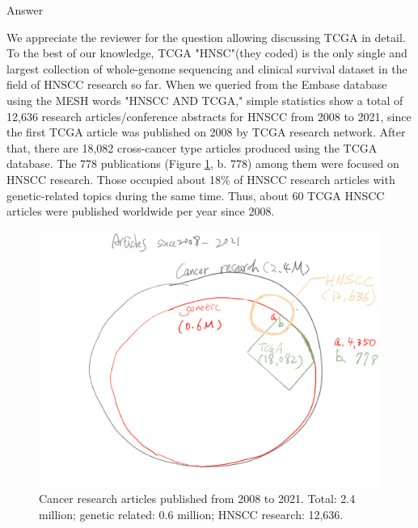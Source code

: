 \documentclass[preprint,12pt]{elsarticle}
\newenvironment{MyColorPar}[1]{%
    \leavevmode\color{#1}\ignorespaces%
}{%
}%
\begin{document}
\begin{MyColorPar}{blue}
Answer

We appreciate the reviewer for the question allowing discussing TCGA in detail.\\
To the best of our knowledge, TCGA "HNSC"(they coded) is the only single and largest collection of whole-genome sequencing and clinical survival dataset in the field of HNSCC research so far.
When we queried from the Embase database using the MESH words "HNSCC AND TCGA," simple statistics show a total of 12,636 research articles/conference abstracts for HNSCC from 2008 to 2021, since the first TCGA article was published on 2008\cite{McLendon2008} by TCGA research network.
After that, there are 18,082 cross-cancer type articles produced using the TCGA database. The 778 publications (Figure \ref{figure:fig_embase}, b. 778) among them were focused on HNSCC research. Those occupied about 18\% of HNSCC research articles with genetic-related topics during the same time. Thus, about 60 TCGA HNSCC articles were published worldwide per year since 2008. %
\begin{figure}
\raggedleft
\includegraphics[width=14cm]{Answer_2-1.pdf}
\caption{Cancer research articles published from 2008 to 2021. Total: 2.4 million; genetic related: 0.6 million; HNSCC research: 12,636.}
\label{figure:fig_embase}
\end{figure}
\clearpage


\end{MyColorPar}
\end{document}
